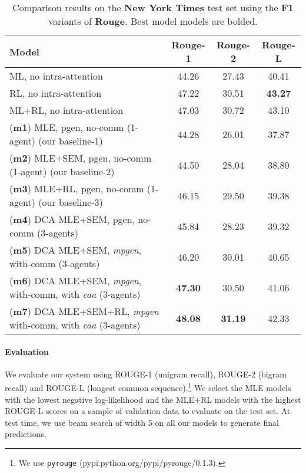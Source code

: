 \documentclass[11pt,a4paper]{article}
\begin{document}
\begin{table*}[ht]
	\small
    \centering
    \begin{tabular}{|l | c | c | c |}
         \hline
         Model & Rouge-1 & Rouge-2 & Rouge-L \\
         \hline
         ML, no intra-attention \cite{rlsummsocher} & 44.26 & 27.43 & 40.41 \\        
         RL, no intra-attention \cite{rlsummsocher} & 47.22 & 30.51 & \textbf{43.27}\\
         ML+RL, no intra-attention\cite{rlsummsocher} & 47.03 & 30.72 & 43.10 \\
         \hline         
         (\textbf{m1}) MLE, pgen, no-comm (1-agent) (our baseline-1) & 44.28 & 26.01& 37.87\\
         (\textbf{m2}) MLE+SEM, pgen, no-comm (1-agent) (our baseline-2) &44.50  & 28.04& 38.80\\
         (\textbf{m3}) MLE+RL, pgen, no-comm (1-agent) (our baseline-3) & 46.15&29.50& 39.38\\
         \hline
         (\textbf{m4}) DCA MLE+SEM, pgen, no-comm (3-agents) & 45.84	& 28.23	& 39.32 \\
         (\textbf{m5}) DCA MLE+SEM, \textit{mpgen}, with-comm (3-agents) & 46.20& 30.01& 40.65\\
         (\textbf{m6}) DCA MLE+SEM, \textit{mpgen}, with-comm, with \textit{caa} (3-agents) & \textbf{47.30} & 30.50 & 41.06 \\
         (\textbf{m7}) DCA MLE+SEM+RL, \textit{mpgen} with-comm, with \textit{caa} (3-agents) & \textbf{48.08} & \textbf{31.19} & 42.33\\         
         \hline
    \end{tabular}
    \vspace{-0.05in}
    \caption{Comparison results on the \textbf{New York Times} test set using the \textbf{F1} variants of \textbf{Rouge}. Best model models are bolded.}
    \label{tab:summ2}
\end{table*}
\paragraph{Evaluation}
We evaluate our system using 
ROUGE-1 (unigram recall), ROUGE-2 (bigram recall) and ROUGE-L (longest common sequence).\footnote{We use \texttt{pyrouge} (pypi.python.org/pypi/pyrouge/0.1.3).} 
We select the MLE models with the lowest negative log-likelihood and the MLE+RL models with the highest ROUGE-L scores on a sample of validation data to evaluate on the test set. At test time, we use beam search of width 5 on all our models to generate final predictions.
\end{document}
